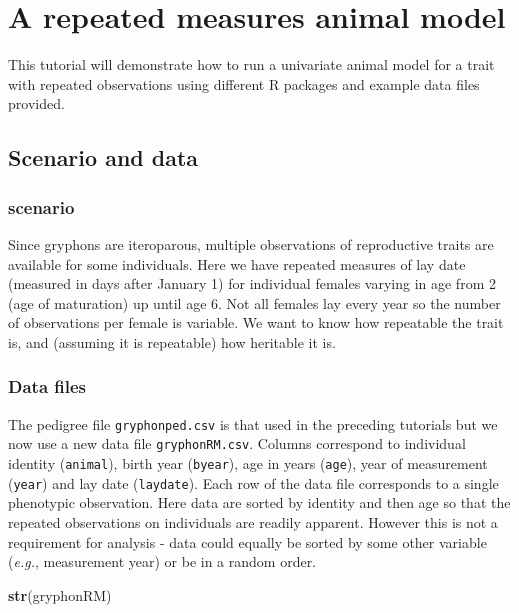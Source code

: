 \documentclass[12pt,]{book}
\newenvironment{Shaded}{\begin{snugshade}}{\end{snugshade}}
\newcommand{\KeywordTok}[1]{\textcolor[rgb]{0.13,0.29,0.53}{\textbf{#1}}}
\newcommand{\NormalTok}[1]{#1}
\begin{document}
\hypertarget{rep_measures}{%
\chapter{A repeated measures animal model}\label{rep_measures}}

This tutorial will demonstrate how to run a univariate animal model for a trait with repeated observations using different R packages and example data files provided.

\hypertarget{scenario-and-data-2}{%
\section{Scenario and data}\label{scenario-and-data-2}}

\hypertarget{scenario-2}{%
\subsection{scenario}\label{scenario-2}}

Since gryphons are iteroparous, multiple observations of reproductive traits are available for some individuals. Here we have repeated measures of lay date (measured in days after January 1) for individual females varying in age from 2 (age of maturation) up until age 6. Not all females lay every year so the number of observations per female is variable. We want to know how repeatable the trait is, and (assuming it is repeatable) how heritable it is.

\hypertarget{data-files-2}{%
\subsection{Data files}\label{data-files-2}}

The pedigree file \texttt{gryphonped.csv} is that used in the preceding tutorials but we now use a new data file \texttt{gryphonRM.csv}. Columns correspond to individual identity (\texttt{animal}), birth year (\texttt{byear}), age in years (\texttt{age}), year of measurement (\texttt{year}) and lay date (\texttt{laydate}). Each row of the data file corresponds to a single phenotypic observation. Here data are sorted by identity and then age so that the repeated observations on individuals are readily apparent. However this is not a requirement for analysis - data could equally be sorted by some other variable (\emph{e.g.}, measurement year) or be in a random order.

\begin{Shaded}
\begin{Highlighting}[]
\KeywordTok{str}\NormalTok{(gryphonRM)}
\end{Highlighting}
\end{Shaded}
\end{document}
